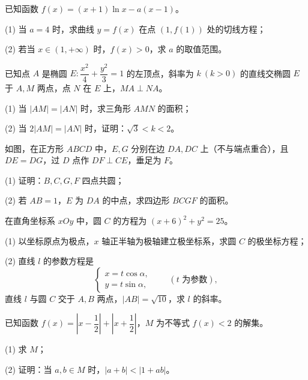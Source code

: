 \begin{question}
已知函数 $f(x)=(x+1)\ln x-a(x-1)$。

   (1) 当 $a=4$ 时，求曲线 $y=f(x)$ 在点 $(1,f(1))$ 处的切线方程；

   (2) 若当 $x\in(1,+\infty)$ 时，$f(x)>0$，求 $a$ 的取值范围。

\end{question}
\begin{question}
已知点 $A$ 是椭圆 $E:\dfrac{x^2}{4}+\dfrac{y^2}{3}=1$ 的左顶点，斜率为 $k\ (k>0)$ 的直线交椭圆 $E$ 于 $A,M$ 两点，点 $N$ 在 $E$ 上，$MA\perp NA$。

   (1) 当 $|AM|=|AN|$ 时，求三角形 $AMN$ 的面积；

   (2) 当 $2|AM|=|AN|$ 时，证明：$\sqrt3<k<2$。

\Needspace{0.4\textheight}
\end{question}
\begin{question}
如图，在正方形 $ABCD$ 中，$E,G$ 分别在边 $DA,DC$ 上（不与端点重合），且 $DE=DG$，过 $D$ 点作 $DF\perp CE$，垂足为 $F$。
\nopagebreak[4]
\begin{center}\end{center}
\nopagebreak[4]
   (1) 证明：$B,C,G,F$ 四点共圆；

   (2) 若 $AB=1$，$E$ 为 $DA$ 的中点，求四边形 $BCGF$ 的面积。

\end{question}
\begin{question}
在直角坐标系 $xOy$ 中，圆 $C$ 的方程为 $(x+6)^2+y^2=25$。

   (1) 以坐标原点为极点，$x$ 轴正半轴为极轴建立极坐标系，求圆 $C$ 的极坐标方程；

   (2) 直线 $l$ 的参数方程是
\nopagebreak[4]
\[
   \begin{cases}
   x=t\cos\alpha,\\
   y=t\sin\alpha,
   \end{cases}\qquad(t\text{ 为参数}),
\]
   直线 $l$ 与圆 $C$ 交于 $A,B$ 两点，$|AB|=\sqrt{10}$，求 $l$ 的斜率。

\end{question}
\begin{question}
已知函数 $f(x)=\left|x-\dfrac12\right|+\left|x+\dfrac12\right|$，$M$ 为不等式 $f(x)<2$ 的解集。

   (1) 求 $M$；

   (2) 证明：当 $a,b\in M$ 时，$|a+b|<|1+ab|$。

\end{question}